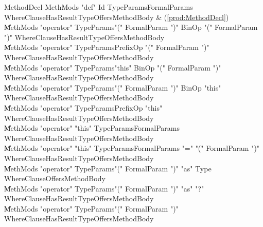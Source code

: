 \begin{bbgrammar}
          MethodDecl \: MethMods \xcd"def" Id TypeParams\opt FormalParams WhereClause\opt HasResultType\opt Offers\opt MethodBody & (\ref{prod:MethodDecl}) \\
                    \| MethMods \xcd"operator" TypeParams\opt \xcd"(" FormalParam  \xcd")" BinOp \xcd"(" FormalParam  \xcd")" WhereClause\opt HasResultType\opt Offers\opt MethodBody \\
                    \| MethMods \xcd"operator" TypeParams\opt PrefixOp \xcd"(" FormalParam  \xcd")" WhereClause\opt HasResultType\opt Offers\opt MethodBody \\
                    \| MethMods \xcd"operator" TypeParams\opt \xcd"this" BinOp \xcd"(" FormalParam  \xcd")" WhereClause\opt HasResultType\opt Offers\opt MethodBody \\
                    \| MethMods \xcd"operator" TypeParams\opt \xcd"(" FormalParam  \xcd")" BinOp \xcd"this" WhereClause\opt HasResultType\opt Offers\opt MethodBody \\
                    \| MethMods \xcd"operator" TypeParams\opt PrefixOp \xcd"this" WhereClause\opt HasResultType\opt Offers\opt MethodBody \\
                    \| MethMods \xcd"operator" \xcd"this" TypeParams\opt FormalParams WhereClause\opt HasResultType\opt Offers\opt MethodBody \\
                    \| MethMods \xcd"operator" \xcd"this" TypeParams\opt FormalParams \xcd"=" \xcd"(" FormalParam  \xcd")" WhereClause\opt HasResultType\opt Offers\opt MethodBody \\
                    \| MethMods \xcd"operator" TypeParams\opt \xcd"(" FormalParam  \xcd")" \xcd"as" Type WhereClause\opt Offers\opt MethodBody \\
                    \| MethMods \xcd"operator" TypeParams\opt \xcd"(" FormalParam  \xcd")" \xcd"as" \xcd"?" WhereClause\opt HasResultType\opt Offers\opt MethodBody \\
                    \| MethMods \xcd"operator" TypeParams\opt \xcd"(" FormalParam  \xcd")" WhereClause\opt HasResultType\opt Offers\opt MethodBody \\
\end{bbgrammar}



